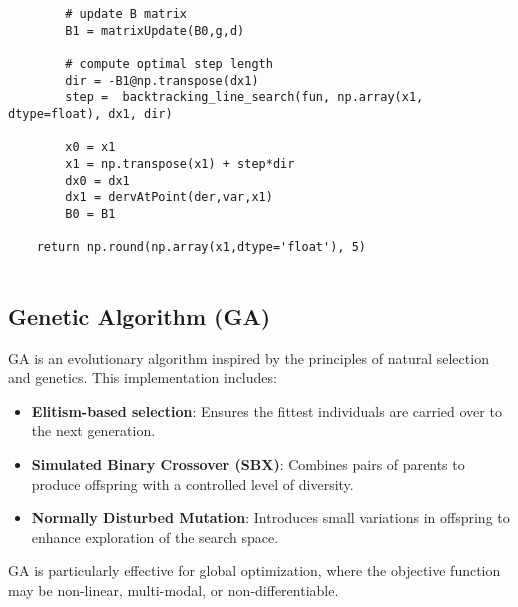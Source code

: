 \documentclass[12pt,a4paper,oneside]{paper} %
\begin{document}
\begin{verbatim}
        # update B matrix
        B1 = matrixUpdate(B0,g,d)
    
        # compute optimal step length
        dir = -B1@np.transpose(dx1)
        step =  backtracking_line_search(fun, np.array(x1, dtype=float), dx1, dir)

        x0 = x1
        x1 = np.transpose(x1) + step*dir
        dx0 = dx1
        dx1 = dervAtPoint(der,var,x1)
        B0 = B1
    
    return np.round(np.array(x1,dtype='float'), 5)
    
\end{verbatim}

\subsection*{Genetic Algorithm (GA)}

GA is an evolutionary algorithm inspired by the principles of natural selection and genetics. This implementation includes:
\begin{itemize}
    \item \textbf{Elitism-based selection}: Ensures the fittest individuals are carried over to the next generation.
    \item \textbf{Simulated Binary Crossover (SBX)}: Combines pairs of parents to produce offspring with a controlled level of diversity.
    \item \textbf{Normally Disturbed Mutation}: Introduces small variations in offspring to enhance exploration of the search space.
\end{itemize}
GA is particularly effective for global optimization, where the objective function may be non-linear, multi-modal, or non-differentiable.
\end{document}
